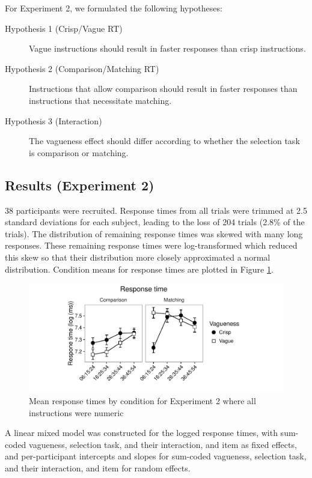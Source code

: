 For Experiment 2, we formulated the following hypotheses:

\begin{description}
	\item [Hypothesis 1 (Crisp/Vague RT)] Vague instructions should result in faster responses than crisp instructions.
	\item [Hypothesis 2 (Comparison/Matching RT)] Instructions that allow comparison should result in faster responses than instructions that necessitate matching.
	\item [Hypothesis 3 (Interaction)] The vagueness effect should differ according to whether the selection task is comparison or matching.
\end{description}

\subsection{Results (Experiment 2)}

38 participants were recruited. Response times from all trials were trimmed at 2.5 standard deviations for each subject, leading to the loss of 204 trials (2.8\% of the trials). The distribution of remaining response times was skewed with many long responses. These remaining response times were log-transformed which reduced this skew so that their distribution more closely approximated a normal distribution. Condition means for response times are plotted in Figure \ref{resultsD-exp-2}. 

\begin{figure}[htbp]
\centering
\includegraphics[width=\textwidth]{figures/De2-rtplot-1.pdf}
\caption{Mean response times by condition for Experiment 2 where all instructions were numeric}
\label{resultsD-exp-2}
\end{figure}

A linear mixed model was constructed for the logged response times, with sum-coded vagueness, selection task, and their interaction, and item as fixed effects, and per-participant intercepts and slopes for sum-coded vagueness, selection task, and their interaction, and item for random effects.

